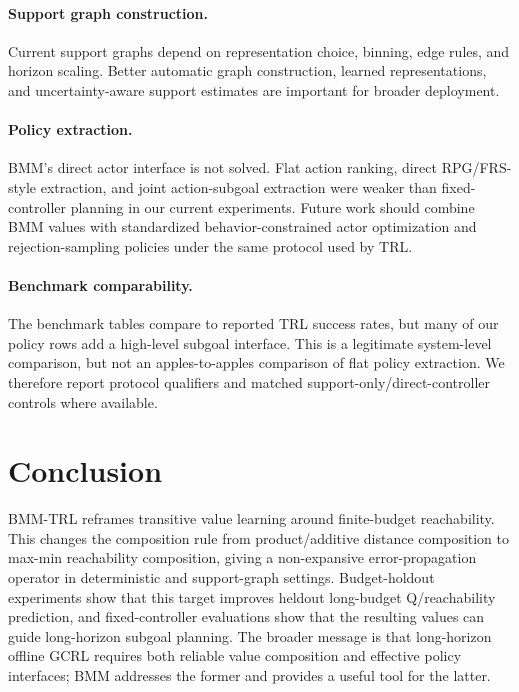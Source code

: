 \documentclass[11pt]{article}
\begin{document}
\paragraph{Support graph construction.}
Current support graphs depend on representation choice, binning, edge rules, and
horizon scaling. Better automatic graph construction, learned representations,
and uncertainty-aware support estimates are important for broader deployment.

\paragraph{Policy extraction.}
BMM's direct actor interface is not solved. Flat action ranking, direct
RPG/FRS-style extraction, and joint action-subgoal extraction were weaker than
fixed-controller planning in our current experiments. Future work should combine
BMM values with standardized behavior-constrained actor optimization and
rejection-sampling policies under the same protocol used by TRL.

\paragraph{Benchmark comparability.}
The benchmark tables compare to reported TRL success rates, but many of our
policy rows add a high-level subgoal interface. This is a legitimate system-level
comparison, but not an apples-to-apples comparison of flat policy extraction. We
therefore report protocol qualifiers and matched support-only/direct-controller
controls where available.

\section{Conclusion}

BMM-TRL reframes transitive value learning around finite-budget reachability.
This changes the composition rule from product/additive distance composition to
max-min reachability composition, giving a non-expansive error-propagation
operator in deterministic and support-graph settings. Budget-holdout experiments
show that this target improves heldout long-budget Q/reachability prediction,
and fixed-controller evaluations show that the resulting values can guide
long-horizon subgoal planning. The broader message is that long-horizon offline
GCRL requires both reliable value composition and effective policy interfaces;
BMM addresses the former and provides a useful tool for the latter.
\end{document}
